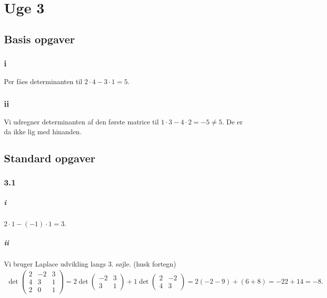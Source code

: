 
\chapter{Uge 3}

	\section{Basis opgaver}

		\subsection{i}

			Per \cite[Eksempel 3.2.25]{hesselholt2017} fåes determinanten til $2\cdot 4 - 3 \cdot 1=5$.

		\subsection{ii}

			Vi udregner determinanten af den første matrice til $1 \cdot 3 - 4\cdot 2=-5 \neq 5$. De er da ikke lig med hinanden.

	\section{Standard opgaver}

		\subsection{3.1}

			\paragraph{i} $2\cdot 1 - (-1)\cdot 1=3$. 

			\paragraph{ii} Vi bruger Laplace udvikling langs 3. søjle. (husk fortegn)
				\begin{align*}
					\det \left(\begin{array}{rrr}{2} & {-2} & {3} \\ {4} & {3} & {1} \\ {2} & {0} & {1}\end{array}\right)= 2 \det \left(\begin{array}{rr} -2 & 3 \\ 3 & 1 \end{array}\right) + 1 \det \left(\begin{array}{rr} 2 & -2 \\ 4 & 3 \end{array}\right) = 2(-2-9)+(6+8) = -22+14=-8.
				\end{align*}

